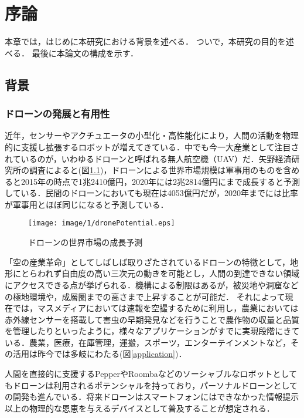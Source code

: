 \chapter{序論}
本章では，はじめに本研究における背景を述べる．
ついで，本研究の目的を述べる．
最後に本論文の構成を示す．

\section{背景}
\subsection{ドローンの発展と有用性}
近年，センサーやアクチュエータの小型化・高性能化により，人間の活動を物理的に支援し拡張するロボットが増えてきている．中でも今一大産業として注目されているのが，いわゆるドローンと呼ばれる無人航空機（UAV）だ．矢野経済研究所の調査によると(図\ref{dronePotential})，ドローンによる世界市場規模は軍事用のものを含めると2015年の時点で1兆2410億円，2020年には2兆2814億円にまで成長すると予測している\cite{Yano}．民間のドローンにおいても現在は4053億円だが，2020年までには比率が軍事用とほぼ同じになると予測している．

\begin{figure}[htbp]
 \begin{center}
  \texttt{[image: image/1/dronePotential.eps]}
 \end{center}
 \caption{ドローンの世界市場の成長予測}
 \label{dronePotential}
\end{figure} 

「空の産業革命」としてしばしば取りざたされているドローンの特徴として，地形にとらわれず自由度の高い三次元の動きを可能とし，人間の到達できない領域にアクセスできる点が挙げられる．機構による制限はあるが，被災地や洞窟などの極地環境や，成層圏までの高さまで上昇することが可能だ．
それによって現在では，マスメディアにおいては速報を空撮するために利用し，農業においては赤外線センサーを搭載して害虫の早期発見などを行うことで農作物の収量と品質を管理したりといったように，様々なアプリケーションがすでに実現段階にきている．農業，医療，在庫管理，運搬，スポーツ，エンターテインメントなど，その活用は昨今では多岐にわたる(図\ref{application})．

人間を直接的に支援するPepperやRoombaなどのソーシャブルなロボットとしてもドローンは利用されるポテンシャルを持っており，パーソナルドローンとしての開発も進んでいる\cite{Fleye}．将来ドローンはスマートフォンにはできなかった情報提示以上の物理的な恩恵を与えるデバイスとして普及することが想定される．

